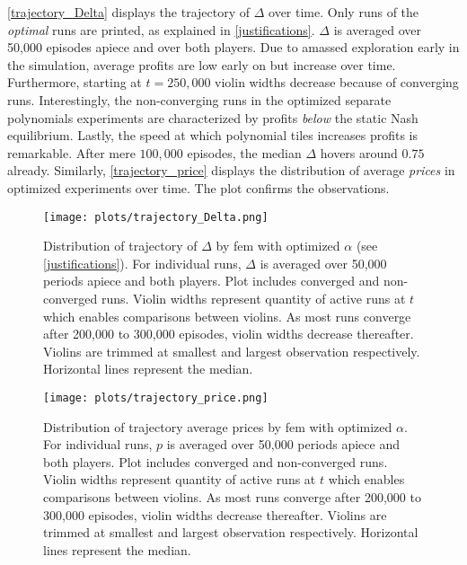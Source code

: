 \autoref{trajectory_Delta} displays the trajectory of $\Delta$ over time. Only runs of the \emph{optimal} runs are printed, as explained in \autoref{justifications}. $\Delta$ is averaged over 50,000 episodes apiece and over both players. Due to amassed exploration early in the simulation, average profits are low early on but increase over time. Furthermore, starting at $t = 250,000$ violin widths decrease because of converging runs. Interestingly, the non-converging runs in the optimized separate polynomials experiments are characterized by profits \emph{below} the static Nash equilibrium. Lastly, the speed at which polynomial tiles increases profits is remarkable. After mere $100,000$ episodes, the median $\Delta$ hovers around $0.75$ already. Similarly, \autoref{trajectory_price} displays the distribution of average \emph{prices} in optimized experiments over time. The plot confirms the observations.

\begin{figure}
	\texttt{[image: plots/trajectory\_Delta.png]}
	\caption[Distribution of trajectory of $\Delta$ by \gls{fem}]{Distribution of trajectory of $\Delta$ by \gls{fem} with optimized $\alpha$ (see \autoref{justifications}). For individual runs, $\Delta$ is averaged over 50,000 periods apiece and both players. Plot includes converged and non-converged runs. Violin widths represent quantity of active runs at $t$ which enables comparisons between violins. As most runs converge after 200,000 to 300,000 episodes, violin widths decrease thereafter. Violins are trimmed at smallest and largest observation respectively. Horizontal lines represent the median.}
	\label{trajectory_Delta}
\end{figure}

\begin{figure}
	\texttt{[image: plots/trajectory\_price.png]}
	\caption[Distribution of trajectory of average prices by \gls{fem}]{Distribution of trajectory average prices by \gls{fem} with optimized $\alpha$. For individual runs, $p$ is averaged over 50,000 periods apiece and both players. Plot includes converged and non-converged runs. Violin widths represent quantity of active runs at $t$ which enables comparisons between violins. As most runs converge after 200,000 to 300,000 episodes, violin widths decrease thereafter. Violins are trimmed at smallest and largest observation respectively. Horizontal lines represent the median.}
	\label{trajectory_price}
\end{figure}

